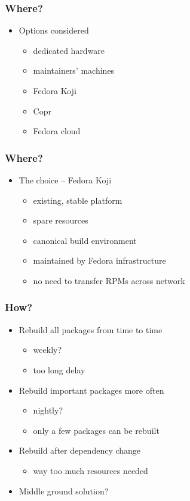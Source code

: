 \documentclass[pdftex,unicode,xcolor=table]{beamer}
\begin{document}
\begin{frame}
  \frametitle{Where?}
  \begin{itemize}
  \item Options considered
    \begin{itemize}
      \item dedicated hardware
      \item maintainers' machines
      \item Fedora Koji
      \item Copr
      \item Fedora cloud
    \end{itemize}
  \end{itemize}
\end{frame}

\begin{frame}
  \frametitle{Where?}
  \begin{itemize}
  \item The choice -- Fedora Koji
    \begin{itemize}
      \item existing, stable platform
      \item spare resources
      \item canonical build environment
      \item maintained by Fedora infrastructure
      \item no need to transfer RPMs across network
    \end{itemize}
  \end{itemize}
\end{frame}

\begin{frame}
  \frametitle{How?}
  \begin{itemize}
  \item Rebuild all packages from time to time
    \begin{itemize}
      \item weekly?
      \item too long delay
    \end{itemize}
  \item Rebuild important packages more often
    \begin{itemize}
      \item nightly?
      \item only a few packages can be rebuilt
    \end{itemize}
  \item Rebuild after dependency change
    \begin{itemize}
      \item way too much resources needed
    \end{itemize}
  \item Middle ground solution?
  \end{itemize}
\end{frame}
\end{document}
